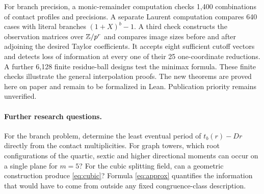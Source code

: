 For branch precision, a monic-remainder computation checks 1,400 combinations of contact profiles and precisions. A separate Laurent computation compares 640 cases with literal branches $(1+X)^b-1$. A third check constructs the observation matrices over $\mathbb Z/p^r$ and compares image sizes before and after adjoining the desired Taylor coefficients. It accepts eight sufficient cutoff vectors and detects loss of information at every one of their 25 one-coordinate reductions. A further 6,128 finite residue-ball designs test the minimax formula. These finite checks illustrate the general interpolation proofs. The new theorems are proved here on paper and remain to be formalized in Lean. Publication priority remains unverified.

\paragraph{Further research questions.}
For the branch problem, determine the least eventual period of $t_b(r)-Dr$ directly from the contact multiplicities. For graph towers, which root configurations of the quartic, sextic and higher directional moments can occur on a single plane for $m=5$? For the cubic splitting field, can a geometric construction produce \eqref{eq:cubic}? Formula \eqref{eq:approx} quantifies the information that would have to come from outside any fixed congruence-class description.

